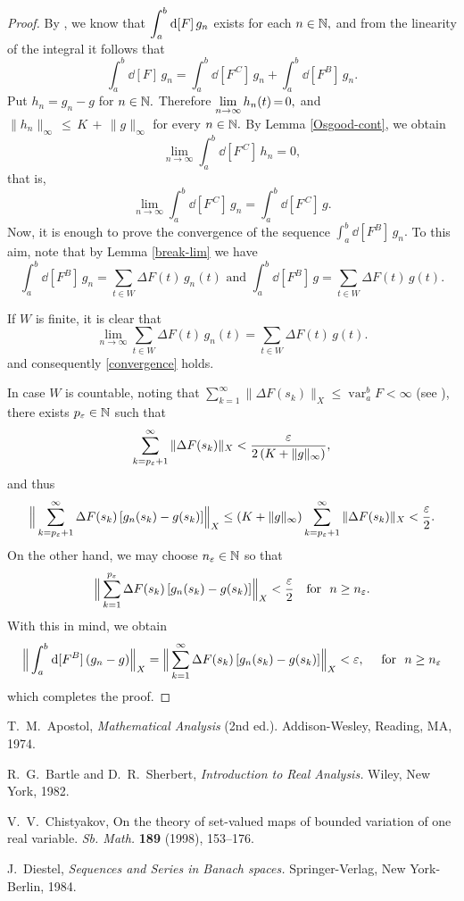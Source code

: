 \documentclass[12pt,twoside]{article}
\numberwithin{equation}{section}
\theoremstyle{plain}
\theoremstyle{definition}
\DeclareMathOperator{\var}{var}
\begin{document}
{\begin{proof}
By \cite[Propostion 15]{Sch1}, we know that $\displaystyle\int_a^b\hskip0.2mm\mbox{\rm d}[F]\,g_n$ exists for
each $n\in{\mathbb N},$ and from the linearity of the integral it follows that
\[
   \int_a^b\dd[F]\,g_n=\int_a^b\dd[F^{\,C}]\,g_n+\int_a^b\dd[F^B]\,g_n.
\]
Put $h_n=g_n-g$ for $n\in{\mathbb N}.$ Therefore $\displaystyle\lim_{n\to\infty}h_n(t)\,{=}\,0,$ and
$\|h_n\|_\infty\,{\le}\,K\,{+}\,\|g\|_\infty$ for every $n\in{\mathbb N}.$ By Lemma \ref{Osgood-cont},
we obtain
\[
   \lim_{n\to\infty}\int_a^b\dd[F^{\,C}]\,h_n=0,
\]
that is,
\[
   \lim_{n\to\infty}\int_a^b\dd[F^{\,C}]\,g_n=\int_a^b\dd[F^{\,C}]\,g.
\]
Now, it is enough to prove the convergence of the sequence $\int_a^b\dd[F^B]\,g_n.$
To this aim, note that by Lemma \ref{break-lim} we have
\[
  \int_a^b\dd[F^B]\,g_n=\sum_{t\in W}\Delta F(t)\,g_n(t)
  \mbox{ \ and \ }
  \int_a^b\dd[F^B]\,g=\sum_{t\in W}\Delta F(t)\,g(t).
\]

If $W$ is finite, it is clear that
\[
  \lim_{n\to\infty}\sum_{t\in W}\Delta F(t)\,g_n(t)=\sum_{t\in W}\Delta F(t)\,g(t).
\]
and consequently \eqref{convergence} holds.

In case $W$ is countable, noting that
$\sum_{k{=}1}^\infty\|\Delta F(s_k)\|_X\le\var_a^bF<\infty$ (see \cite[Lemma 4.1]{MT2}),
there exists $p_\varepsilon\in{\mathbb N}$ such that
\[
  \sum_{k=p_\varepsilon+1}^\infty\|\Delta F(s_k)\|_X<\frac{\varepsilon}{2\,(K+\|g\|_\infty)},
\]
and thus
\[
  \Big\|\sum_{k=p_\varepsilon+1}^\infty\Delta F(s_k)\,[g_n(s_k)-g(s_k)]\Big\|_X
  \le(K+\|g\|_\infty)\sum_{k=p_\varepsilon+1}^\infty\|\Delta F(s_k)\|_X
  <\frac{\varepsilon}{2}.
\]
On the other hand, we may choose $n_\varepsilon\in{\mathbb N}$ so that
\[
   \Big\|\sum_{k=1}^{p_\varepsilon}\Delta F(s_k)\,[g_n(s_k)-g(s_k)]\Big\|_X<\frac{\varepsilon}{2}
   \quad\mbox{for \ }n\ge n_\varepsilon.
\]
With this in mind, we obtain
\[
    \Big\|\int_a^b\hskip0.2mm\mbox{\rm d}[F^B]\,(g_n-g)\Big\|_X
   =\Big\|\sum_{k=1}^\infty\Delta F(s_k)\,[g_n(s_k)-g(s_k)]\Big\|_X<\varepsilon,
	\quad\mbox{ for \ } n\ge n_\varepsilon
\]
which completes the proof.
\end{proof}

\begin{thebibliography}{99}

T.~M.~Apostol,
{\sl Mathematical Analysis} (2nd ed.).
Addison-Wesley, Reading, MA, 1974.

R.~G.~Bartle and D.~R.~Sherbert,
{\sl Introduction to Real Analysis.}
Wiley, New York, 1982.

V.~V.~Chistyakov,
On the theory of set-valued maps of bounded variation of one real variable.
{\sl  Sb. Math.} {\bf 189} (1998), 153--176.

J.~Diestel,
{\sl Sequences and Series in Banach spaces.}
Springer-Verlag, New York-Berlin, 1984.


\end{thebibliography}}
\end{document}

